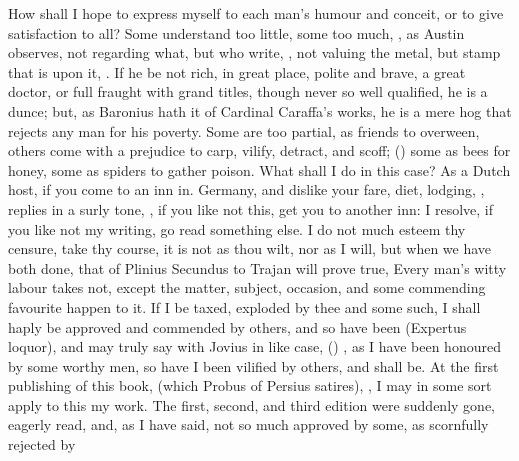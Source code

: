 {How shall I hope to express myself to each man's humour and
conceit, or to give satisfaction to all? Some understand too
little, some too much, , as Austin observes, not regarding what, but who
write, , not valuing the metal,
but stamp that is upon it, . If he
be not rich, in great place, polite and brave, a great doctor, or full
fraught with grand titles, though never so well qualified, he is a
dunce; but, as Baronius hath it of Cardinal Caraffa's works, he is
a mere hog that rejects any man for his poverty. Some are too partial,
as friends to overween, others come with a prejudice to carp, vilify,
detract, and scoff; () some as bees for honey, some as spiders to gather
poison. What shall I do in this case? As a Dutch host, if you come to
an inn in. Germany, and dislike your fare, diet, lodging, \etc, replies
in a surly tone, , if you like not
this, get you to another inn: I resolve, if you like not my writing, go
read something else. I do not much esteem thy censure, take thy course,
it is not as thou wilt, nor as I will, but when we have both done, that
of Plinius Secundus to Trajan will prove true, Every man's witty
labour takes not, except the matter, subject, occasion, and some
commending favourite happen to it. If I be taxed, exploded by thee and
some such, I shall haply be approved and commended by others, and so
have been (Expertus loquor), and may truly say with Jovius in like
case, () , as I have been
honoured by some worthy men, so have I been vilified by others, and
shall be. At the first publishing of this book, (which Probus of
Persius satires), , I may in some sort apply to this my work. The
first, second, and third edition were suddenly gone, eagerly read, and,
as I have said, not so much approved by some, as scornfully rejected by
}
